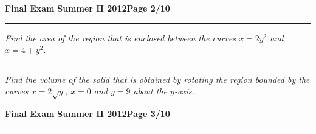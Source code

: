 \documentclass[12pt]{article}
\begin{document}
\hfill{\large\bf Final Exam}\hfill{\large\bf
  Summer II 2012}\hfill{\large\bf Page 2/10}\hrule

\bigskip
{\problem[5 pts] \em  Find the area of the region that is enclosed between the
curves $x=2y^2$ and $x=4+y^2$.} 
\vspace{8.5cm}
\begin{flushright}
\end{flushright}
\hrule
{\problem[5 pts] \em Find the volume of the solid that is obtained by rotating
the region bounded by the curves $x=2\sqrt{y}$, $x=0$ and $y=9$ about the
$y$-axis.} \vspace{8.5cm}
\begin{flushright}
\end{flushright}
\newpage

\hfill{\large\bf Final Exam}\hfill{\large\bf
  Summer II 2012}\hfill{\large\bf Page 3/10}\hrule
\end{document}
